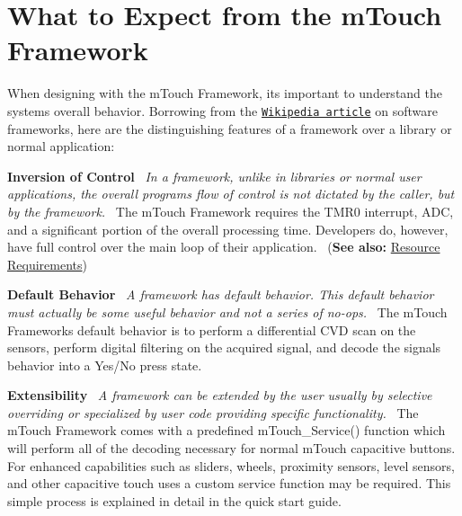 \hypertarget{_getting_started_Expect}{}\section{What to Expect from the m\+Touch Framework}\label{_getting_started_Expect}
When designing with the m\+Touch Framework, it\textquotesingle{}s important to understand the system\textquotesingle{}s overall behavior. Borrowing from the \href{http://en.wikipedia.org/wiki/Software_framework}{\tt Wikipedia article} on software frameworks, here are the distinguishing features of a framework over a library or normal application\+:~\newline
 \begin{DoxyItemize}
\item {\bfseries Inversion of Control}~\newline
{\itshape In a framework, unlike in libraries or normal user applications, the overall program\textquotesingle{}s flow of control is not dictated by the caller, but by the framework.}~\newline
 The m\+Touch Framework requires the T\+M\+R0 interrupt, A\+D\+C, and a significant portion of the overall processing time. Developers do, however, have full control over the main loop of their application.~\newline
 ({\bfseries See also\+:} \hyperlink{ResourceRequirements}{Resource Requirements})~\newline
~\newline
 \item {\bfseries Default Behavior}~\newline
{\itshape A framework has default behavior. This default behavior must actually be some useful behavior and not a series of no-\/ops.}~\newline
 The m\+Touch Framework\textquotesingle{}s default behavior is to perform a differential C\+V\+D scan on the sensors, perform digital filtering on the acquired signal, and decode the signal\textquotesingle{}s behavior into a Yes/\+No press state.~\newline
~\newline
 \item {\bfseries Extensibility}~\newline
{\itshape A framework can be extended by the user usually by selective overriding or specialized by user code providing specific functionality.}~\newline
 The m\+Touch Framework comes with a predefined m\+Touch\+\_\+\+Service() function which will perform all of the decoding necessary for normal m\+Touch capacitive buttons. For enhanced capabilities such as sliders, wheels, proximity sensors, level sensors, and other capacitive touch uses a custom service function may be required. This simple process is explained in detail in the quick start guide.~\newline

\end{DoxyItemize}
